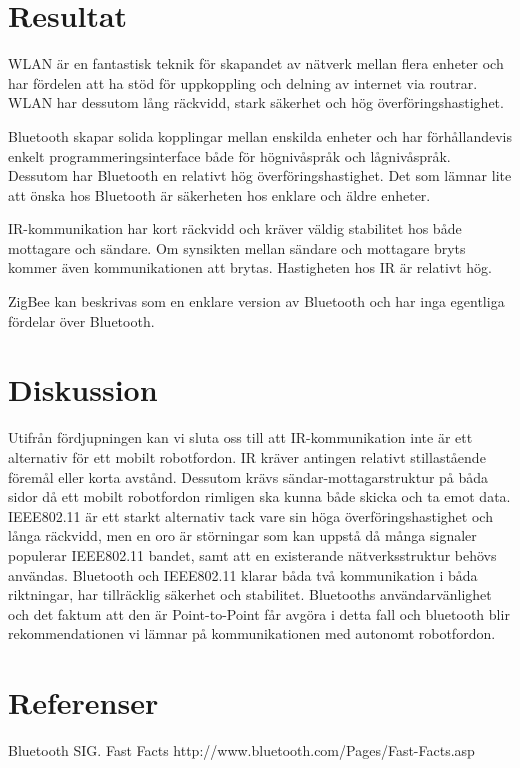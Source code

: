 \documentclass[a4paper,12pt,fleqn]{article}
\begin{document}
\section{Resultat}
WLAN är en fantastisk teknik för skapandet av nätverk mellan flera enheter och har fördelen att ha stöd för uppkoppling och delning av internet via routrar. WLAN har dessutom lång räckvidd, stark säkerhet och hög överföringshastighet.
  
Bluetooth skapar solida kopplingar mellan enskilda enheter och har förhållandevis enkelt programmeringsinterface både för högnivåspråk och lågnivåspråk. Dessutom har Bluetooth en relativt hög överföringshastighet. Det som lämnar lite att önska hos Bluetooth är säkerheten hos enklare och äldre enheter.

IR-kommunikation har kort räckvidd och kräver väldig stabilitet hos både mottagare och sändare. Om synsikten mellan sändare och mottagare bryts kommer även kommunikationen att brytas. Hastigheten hos IR är relativt hög. 

ZigBee kan beskrivas som en enklare version av Bluetooth och har inga egentliga fördelar över Bluetooth. 

\section{Diskussion}
Utifrån fördjupningen kan vi sluta oss till att IR-kommunikation inte är ett alternativ för ett mobilt robotfordon. IR kräver antingen relativt stillastående föremål eller korta avstånd. Dessutom krävs sändar-mottagarstruktur på båda sidor då ett mobilt robotfordon rimligen ska kunna både skicka och ta emot data.
IEEE802.11 är ett starkt alternativ tack vare sin höga överföringshastighet och långa räckvidd, men en oro är störningar som kan uppstå då många signaler populerar IEEE802.11 bandet, samt att en existerande nätverksstruktur behövs användas.
Bluetooth och IEEE802.11 klarar båda två kommunikation i båda riktningar, har tillräcklig säkerhet och stabilitet. Bluetooths användarvänlighet och det faktum att den är Point-to-Point får avgöra i detta fall och bluetooth blir rekommendationen vi lämnar på kommunikationen med autonomt robotfordon.

\newpage 
\section*{Referenser}

Bluetooth SIG. Fast Facts http://www.bluetooth.com/Pages/Fast-Facts.asp 
\end{document}
